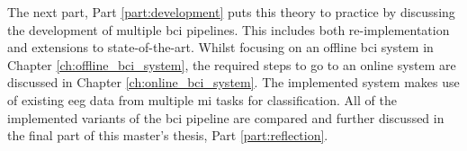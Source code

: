 The next part, Part \ref{part:development} puts this theory to practice by discussing the development of multiple \gls{bci} pipelines.
This includes both re-implementation and extensions to state-of-the-art.
Whilst focusing on an offline \gls{bci} system in Chapter \ref{ch:offline_bci_system}, the required steps to go to an online system are discussed in Chapter \ref{ch:online_bci_system}.
The implemented system makes use of existing \gls{eeg} data from multiple \gls{mi} tasks for classification.
All of the implemented variants of the \gls{bci} pipeline are compared and further discussed in the final part of this master's thesis, Part \ref{part:reflection}.